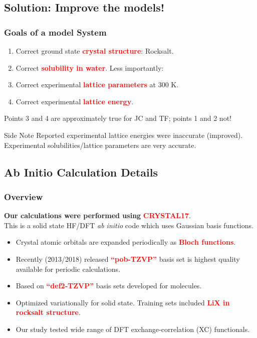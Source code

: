 \documentclass{beamer}
\newcommand{\insertcurrentcitation}{}
\newcommand{\currentcitation}[1]{
	\renewcommand{\insertcurrentcitation}{#1}
} %
\newcommand{\bb}[1]{\textcolor{red}{\textbf{#1}}}
\begin{document}
\subsection{Solution: Improve the models!}
\begin{frame}
\frametitle{Goals of a model System}	
	\begin{enumerate}
		\item Correct ground state \bb{crystal structure}: Rocksalt.
		\item Correct \bb{solubility in water}.
		\pause
		Less importantly:
		\item Correct experimental \bb{lattice parameters} at 300 K.
		\item Correct experimental \bb{lattice energy}.
	\end{enumerate}
\pause
Points 3 and 4 are approximately true for JC and TF; points 1 and 2 not!
\begin{alertblock}{Side Note}
	Reported experimental lattice energies were inaccurate (improved). Experimental solubilities/lattice parameters are very accurate.
\end{alertblock}
\end{frame}

\subsection{Ab Initio Calculation Details}


\currentcitation{\cite{Peintinger2013}}
\begin{frame}
\frametitle{Overview}
\textbf{Our calculations were performed using} \bb{CRYSTAL17}.\\ 
This is a solid state HF/DFT \textit{ab initio} code which uses Gaussian basis functions.
\pause
\begin{itemize}
	\item Crystal atomic orbitals are expanded periodically as \bb{Bloch functions}.
	\item Recently (2013/2018) released \bb{``pob-TZVP''} basis set is highest quality available for periodic calculations.
	\item Based on \bb{``def2‐TZVP''} basis sets developed for molecules.
	\item Optimized variationally for solid state. Training sets included \bb{LiX in rocksalt structure}.
	\item Our study tested wide range of DFT exchange-correlation (XC) functionals.
\end{itemize}
\end{frame}
\end{document}
